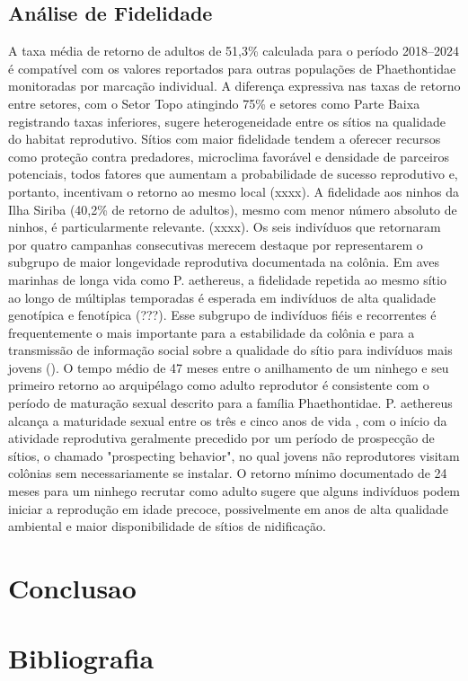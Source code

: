 \documentclass[11pt]{article}
\newcommand{\todorevisao}[1]{%
  \todo[color=green!20]{Revisão: #1}}
\begin{document}
\subsection{Análise de Fidelidade}
A taxa média de retorno de adultos de 51,3\% calculada para o período 2018–2024 é compatível com os valores reportados para outras populações de Phaethontidae monitoradas por marcação individual. \todorevisao{Trabalhos com taxa de retorno de Phaethon...}
A diferença expressiva nas taxas de retorno entre setores, com o Setor Topo atingindo 75\% e setores como Parte Baixa registrando taxas inferiores, sugere heterogeneidade entre os sítios na qualidade do habitat reprodutivo. Sítios com maior fidelidade tendem a oferecer recursos como proteção contra predadores, microclima favorável e densidade de parceiros potenciais, todos fatores que aumentam a probabilidade de sucesso reprodutivo e, portanto, incentivam o retorno ao mesmo local (xxxx). 
A fidelidade aos ninhos da Ilha Siriba (40,2\% de retorno de adultos), mesmo com menor número absoluto de ninhos, é particularmente relevante. (xxxx). 
Os seis indivíduos que retornaram por quatro campanhas consecutivas merecem destaque por representarem o subgrupo de maior longevidade reprodutiva documentada na colônia. Em aves marinhas de longa vida como P. aethereus, a fidelidade repetida ao mesmo sítio ao longo de múltiplas temporadas é esperada em indivíduos de alta qualidade genotípica e fenotípica (???). Esse subgrupo de indivíduos fiéis e recorrentes é frequentemente o mais importante para a estabilidade da colônia e para a transmissão de informação social sobre a qualidade do sítio para indivíduos mais jovens ().
O tempo médio de 47 meses entre o anilhamento de um ninhego e seu primeiro retorno ao arquipélago como adulto reprodutor é consistente com o período de maturação sexual descrito para a família Phaethontidae. P. aethereus alcança a maturidade sexual entre os três e cinco anos de vida  \parencite{OrtaEtAl2019}, com o início da atividade reprodutiva geralmente precedido por um período de prospecção de sítios, o chamado "prospecting behavior",  no qual jovens não reprodutores visitam colônias sem necessariamente se instalar.
O retorno mínimo documentado de 24 meses para um ninhego recrutar como adulto sugere que alguns indivíduos podem iniciar a reprodução em idade precoce, possivelmente em anos de alta qualidade ambiental e maior disponibilidade de sítios de nidificação. 




\section{Conclusao}
\section{Bibliografia}

\printbibliography
\end{document}
